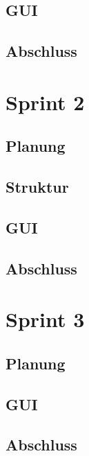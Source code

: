 \documentclass{my_Presentation}
\begin{document}
\subsection*{GUI}

\subsection*{Abschluss}



\section{Sprint 2}
\subsection*{Planung}

\subsection*{Struktur}

\subsection*{GUI}

\subsection*{Abschluss}



\section{Sprint 3}
\subsection*{Planung}

\subsection*{GUI}

\subsection*{Abschluss}



\end{document}
